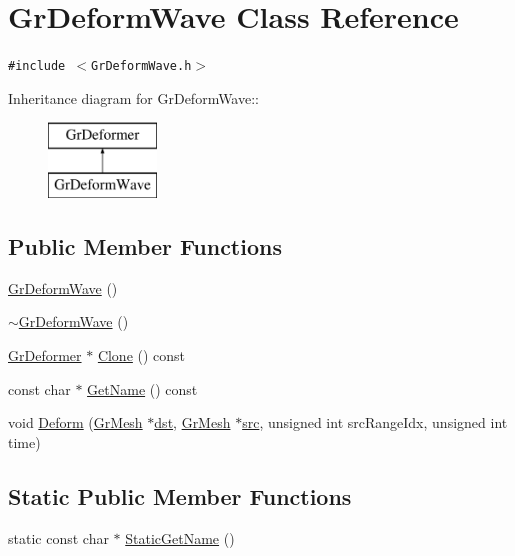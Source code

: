 \hypertarget{class_gr_deform_wave}{
\section{GrDeformWave Class Reference}
\label{class_gr_deform_wave}
}
{\tt \#include $<$GrDeformWave.h$>$}

Inheritance diagram for GrDeformWave::\begin{figure}[H]
\begin{center}
\leavevmode
\includegraphics[height=2cm]{class_gr_deform_wave}
\end{center}
\end{figure}
\subsection*{Public Member Functions}
\begin{CompactItemize}
\item 
\hyperlink{class_gr_deform_wave_c69debe17459a77adfc024a78180bbeb}{GrDeformWave} ()
\item 
\hyperlink{class_gr_deform_wave_feb85501dea03ea7b400b4dca6b4bb32}{$\sim$GrDeformWave} ()
\item 
\hyperlink{class_gr_deformer}{GrDeformer} $\ast$ \hyperlink{class_gr_deform_wave_10a98b00fc599df89a98ba33544c9569}{Clone} () const 
\item 
const char $\ast$ \hyperlink{class_gr_deform_wave_ba87858cdf1442419942004c98691ee4}{GetName} () const 
\item 
void \hyperlink{class_gr_deform_wave_8beb11978116306cb10394563b241eb9}{Deform} (\hyperlink{class_gr_mesh}{GrMesh} $\ast$\hyperlink{glext__bak_8h_92034251bfd455d524a9b5610cddba00}{dst}, \hyperlink{class_gr_mesh}{GrMesh} $\ast$\hyperlink{glext__bak_8h_72e0fdf0f845ded60b1fada9e9195cd7}{src}, unsigned int srcRangeIdx, unsigned int time)
\end{CompactItemize}
\subsection*{Static Public Member Functions}
\begin{CompactItemize}
\item 
static const char $\ast$ \hyperlink{class_gr_deform_wave_7e10cb2db580dc710dfe3f08ca1904bd}{StaticGetName} ()
\end{CompactItemize}

